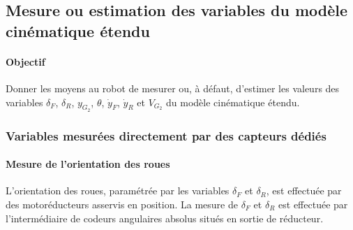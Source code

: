 



\subsection{Mesure ou estimation des variables du modèle cinématique étendu}

\paragraph{Objectif}

Donner les moyens au robot de mesurer ou, à défaut, d'estimer les valeurs des variables $\delta_F$, $\delta_R$, $y_{G_2}$, $\theta$, $\dot{y}_F$, $\dot{y}_R$ et $V_{G_2}$ du modèle cinématique étendu.

\subsubsection{Variables mesurées directement par des capteurs dédiés}

\paragraph{Mesure de l'orientation des roues}

L'orientation des roues, paramétrée par les variables $\delta_F$ et $\delta_R$, est effectuée par des motoréducteurs asservis en position. La mesure de $\delta_F$ et $\delta_R$ est effectuée par l'intermédiaire de codeurs angulaires absolus situés en sortie de réducteur.


